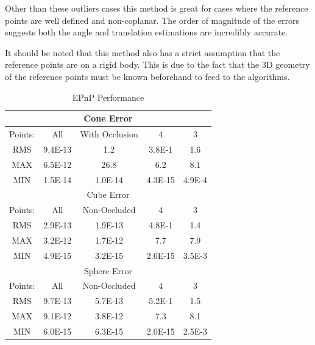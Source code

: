 \documentclass[journal]{IEEEtran}
\begin{document}
 Other than these outliers cases this method is great for cases where the reference points are well defined and non-coplanar. The order of magnitude of the errors suggests both the angle and translation estimations are incredibly accurate.
 
 It should be noted that this method also has a strict assumption that the reference points are on a rigid body. This is due to the fact that the 3D geometry of the reference points must be known beforehand to feed to the algorithms.
 

\begin{table}[H]
	\caption{EPnP Performance}
	\label{EPnP_Table}
	\centering
	\begin{tabular}{|c|c|c|c|c|}
		
		\hline
		\multicolumn{5}{|c|}{Cone Error} \\
		\hline
		Points: & All & With Occlusion & 4 & 3\\
		\hline
		RMS & 9.4E-13  & 1.2 & 3.8E-1 & 1.6\\
		MAX & 6.5E-12 & 26.8 & 6.2 & 8.1\\
		MIN & 1.5E-14 & 1.0E-14 & 4.3E-15 & 4.9E-4\\
		\hline
		\multicolumn{5}{|c|}{Cube Error} \\
		\hline
		Points: & All & Non-Occluded & 4 & 3\\
		\hline
		RMS & 2.9E-13 & 1.9E-13 & 4.8E-1 & 1.4\\
		MAX & 3.2E-12 & 1.7E-12 & 7.7 & 7.9\\
		MIN & 4.9E-15 & 3.2E-15 & 2.6E-15 & 3.5E-3\\
		\hline
		\multicolumn{5}{|c|}{Sphere Error} \\
		\hline
		Points: & All & Non-Occluded & 4 & 3\\
		\hline
		RMS & 9.7E-13 & 5.7E-13 & 5.2E-1 & 1.5\\
		MAX & 9.1E-12 & 3.8E-12 & 7.3 & 8.1\\
		MIN & 6.0E-15 & 6.3E-15 & 2.0E-15 & 2.5E-3\\
		\hline
		
		
	\end{tabular}
\end{table}
\end{document}

